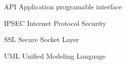 \begin{seznamzkratek}{90}
	
	
		{API}								%
		{Application programable interface}
	
		{IPSEC}								%
		{Internet Protocol Security}
		
		{SSL}								%
		{Secure Socket Layer}
		
		{UML}								%
		{Unified Modeling Language}

												
\end{seznamzkratek}
